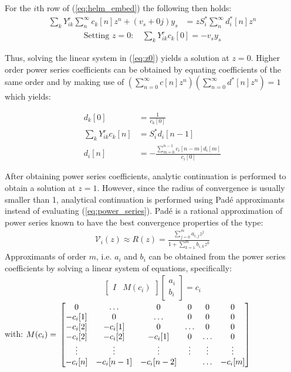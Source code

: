 For the $i$th row of (\ref{eq:helm_embed}) the following then holds:
\begin{align}
\sum_k Y^r_{ik} \sum_n^{\infty} c_k[n]z^n + (v_s+0j)y_s &= zS_i^*\sum_n^{\infty} d^*_i[n]z^n
\end{align}
\begin{align}
\text{Setting $z=0$:\ }&\sum_k Y^r_{ik} c_k[0]  = - v_s y_s \label{eq:z0}
\end{align}

Thus, solving the linear system in (\ref{eq:z0}) yields a solution at $z=0$. Higher order power series coefficients can be obtained by equating coefficients of the same order and by making use of $(\sum_{n=0}^\infty c[n]z^n)  (\sum_{n=0}^\infty d^*[n]z^n) = 1$ which yields:

\begin{align}
d_k[0]  &= \frac{1}{c_k[0]} \label{eq:d0}\\
\sum_k Y^r_{ik} c_k[n]  &= S_i^*d_i[n-1]\\
d_i[n] &= - \frac{\sum_{m=0}^{n-1} c_i[n-m]d_i[m]}{c_i[0]}
\end{align}

After obtaining power series coefficients, analytic continuation is performed to obtain a solution at $z=1$. However, since the radius of convergence is usually smaller than 1, analytical continuation is performed using Pad\'e approximants instead of evaluating (\ref{eq:power_series}). Pad\'e is a rational approximation of power series known to have the best convergence properties \cite{stahl1989convergence} of the type: 
\begin{align}
\mathcal{V}_i(z) \approx R(z)={\frac  {\sum _{{j=0}}^{{m}}a_{i,j}z^{j}}{1+\sum _{{k=1}}^{{m}}b_{i,k}z^{k}}} \label{eq:pade_approx}
\end{align}
Approximants of order $m$, i.e. $a_i$ and $b_i$ can be obtained from the power series coefficients by solving a linear system of equations, specifically:
\begin{align*}
\begin{bmatrix}I & M(c_i)\end{bmatrix} \begin{bmatrix}a_i\\ b_i\end{bmatrix} = c_i
\end{align*}
with: $ M(c_i) = \\
\begin{bmatrix}0 & \hdots  & 0& 0 & 0& 0\\
 -c_i[1] & 0 & \hdots  & 0&  0& 0\\
 -c_i[2]& -c_i[1] & 0  &  \hdots  & 0& 0\\
 -c_i[2]& -c_i[2] & -c_i[1] & 0 & \hdots & 0\\
 \vdots & \vdots & \vdots & \vdots & \vdots & \vdots  \\
  -c_i[n]& -c_i[n-1] & -c_i[n-2] &  & \hdots & -c_i[m]\\
 \end{bmatrix}$ \\ 
 
